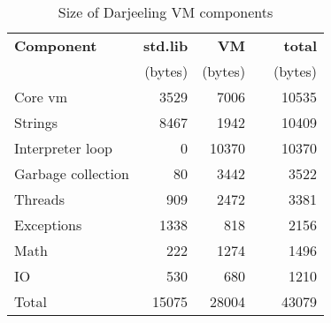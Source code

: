 \begin{table}
\caption{Size of Darjeeling VM components}
\label{tab-vm-size}
    \begin{tabular}{lrrcr}
    \toprule
    \bfseries Component   & \bfseries std.lib & \bfseries VM & & \bfseries total \\
                          & (bytes)                   & (bytes)              & & (bytes)  \\
    \midrule
    \midrule
    Core vm               &  3529                     &  7006                & &           10535 \\
    Strings               &  8467                     &  1942                & &           10409 \\
    Interpreter loop      &     0                     & 10370                & &           10370 \\
    Garbage collection    &    80                     &  3442                & &            3522 \\
    Threads               &   909                     &  2472                & &            3381 \\
    Exceptions            &  1338                     &   818                & &            2156 \\
    Math                  &   222                     &  1274                & &            1496 \\
    IO                    &   530                     &   680                & &            1210 \\
    Total                 & 15075                     & 28004                & &           43079 \\
    \bottomrule
    \end{tabular}
\end{table}
